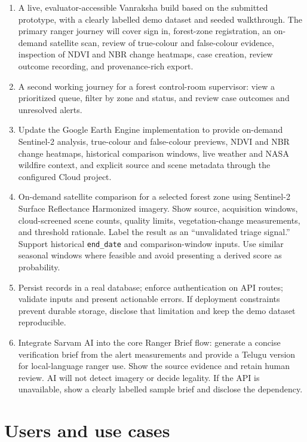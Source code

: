 \documentclass{article}
\begin{document}
\begin{enumerate}
  \item A live, evaluator-accessible Vanraksha build based on the submitted prototype, with a clearly labelled demo dataset and seeded walkthrough. The primary ranger journey will cover sign in, forest-zone registration, an on-demand satellite scan, review of true-colour and false-colour evidence, inspection of NDVI and NBR change heatmaps, case creation, review outcome recording, and provenance-rich export.
  \item A second working journey for a forest control-room supervisor: view a prioritized queue, filter by zone and status, and review case outcomes and unresolved alerts.
  \item Update the Google Earth Engine implementation to provide on-demand Sentinel-2 analysis, true-colour and false-colour previews, NDVI and NBR change heatmaps, historical comparison windows, live weather and NASA wildfire context, and explicit source and scene metadata through the configured Cloud project.
  \item On-demand satellite comparison for a selected forest zone using Sentinel-2 Surface Reflectance Harmonized imagery. Show source, acquisition windows, cloud-screened scene counts, quality limits, vegetation-change measurements, and threshold rationale. Label the result as an ``unvalidated triage signal.'' Support historical \texttt{end\_date} and comparison-window inputs. Use similar seasonal windows where feasible and avoid presenting a derived score as probability.
  \item Persist records in a real database; enforce authentication on API routes; validate inputs and present actionable errors. If deployment constraints prevent durable storage, disclose that limitation and keep the demo dataset reproducible.
  \item Integrate Sarvam AI into the core Ranger Brief flow: generate a concise verification brief from the alert measurements and provide a Telugu version for local-language ranger use. Show the source evidence and retain human review. AI will not detect imagery or decide legality. If the API is unavailable, show a clearly labelled sample brief and disclose the dependency.
\end{enumerate}

\section{Users and use cases}
\end{document}

